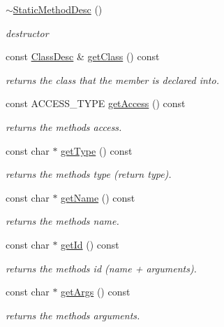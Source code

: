 \begin{DoxyCompactItemize}
\item 
\hyperlink{classagm_1_1reflection_1_1_static_method_desc_a5f17e2b9fd2f950a5589680270568d7f}{$\sim$\+Static\+Method\+Desc} ()\hypertarget{classagm_1_1reflection_1_1_static_method_desc_a5f17e2b9fd2f950a5589680270568d7f}{}\label{classagm_1_1reflection_1_1_static_method_desc_a5f17e2b9fd2f950a5589680270568d7f}

\begin{DoxyCompactList}\small\item\em destructor \end{DoxyCompactList}\item 
const \hyperlink{classagm_1_1reflection_1_1_class_desc}{Class\+Desc} \& \hyperlink{classagm_1_1reflection_1_1_static_method_desc_aa5f9535bb7e48f720068f98fd85c7415}{get\+Class} () const 
\begin{DoxyCompactList}\small\item\em returns the class that the member is declared into. \end{DoxyCompactList}\item 
const A\+C\+C\+E\+S\+S\+\_\+\+T\+Y\+PE \hyperlink{classagm_1_1reflection_1_1_static_method_desc_a6ad2754ed4cd56c0bd7e28bb752165f8}{get\+Access} () const 
\begin{DoxyCompactList}\small\item\em returns the method\textquotesingle{}s access. \end{DoxyCompactList}\item 
const char $\ast$ \hyperlink{classagm_1_1reflection_1_1_static_method_desc_ac2e3243b8073852709d8165480f15f21}{get\+Type} () const 
\begin{DoxyCompactList}\small\item\em returns the method\textquotesingle{}s type (return type). \end{DoxyCompactList}\item 
const char $\ast$ \hyperlink{classagm_1_1reflection_1_1_static_method_desc_a5cc36537811cebc442a06db87a3a289c}{get\+Name} () const 
\begin{DoxyCompactList}\small\item\em returns the method\textquotesingle{}s name. \end{DoxyCompactList}\item 
const char $\ast$ \hyperlink{classagm_1_1reflection_1_1_static_method_desc_ad1b5f80c9ad11662594f237908eea415}{get\+Id} () const 
\begin{DoxyCompactList}\small\item\em returns the method\textquotesingle{}s id (name + arguments). \end{DoxyCompactList}\item 
const char $\ast$ \hyperlink{classagm_1_1reflection_1_1_static_method_desc_acd1ae20f10a9f57736e17c2478cc84ba}{get\+Args} () const 
\begin{DoxyCompactList}\small\item\em returns the method\textquotesingle{}s arguments. \end{DoxyCompactList}\end{DoxyCompactItemize}
